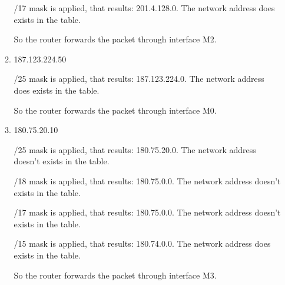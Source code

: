 \documentclass{article}
\begin{document}
\begin{enumerate}
\begin{enumerate}
    /17 mask is applied, that results: 201.4.128.0. The network address does exists in the table.

    So the router forwards the packet through interface M2.
    
    \item 187.123.224.50

    /25 mask is applied, that results: 187.123.224.0. The network address does exists in the table.

    So the router forwards the packet through interface M0.

    \item 180.75.20.10

    /25 mask is applied, that results: 180.75.20.0. The network address doesn't exists in the table.

    /18 mask is applied, that results: 180.75.0.0. The network address doesn't exists in the table.

    /17 mask is applied, that results: 180.75.0.0. The network address doesn't exists in the table.

    /15 mask is applied, that results: 180.74.0.0. The network address does exists in the table.

    So the router forwards the packet through interface M3.

  \end{enumerate}
\end{enumerate}
\end{document}
